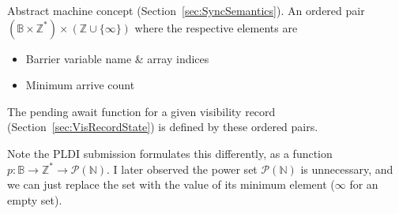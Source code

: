 
Abstract machine concept (Section~\ref{sec:SyncSemantics}).
An ordered pair $(\mathbb{B} \times \mathbb{Z}^*) \times (\mathbb{Z} \cup \{\infty\})$ where the respective elements are
\begin{itemize}
  \item Barrier variable name \& array indices
  \item Minimum arrive count
\end{itemize}
The pending await function for a given visibility record (Section~\ref{sec:VisRecordState}) is defined by these ordered pairs.

Note the PLDI submission formulates this differently, as a function $p : \mathbb{B} \to \mathbb{Z}^* \to \mathcal{P}(\mathbb{N})$.
I later observed the power set $\mathcal{P}(\mathbb{N})$ is unnecessary, and we can just replace the set with the value of its minimum element ($\infty$ for an empty set).

